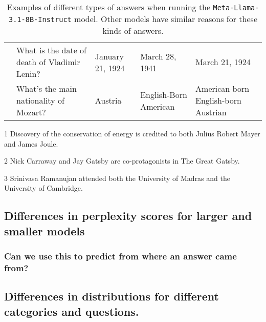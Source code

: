 \begin{table}[p]
\begin{threeparttable}
\begin{tabularx}{\textwidth}{>{\bfseries}c>{\ttfamily}X >{\ttfamily}p{75pt} >{\ttfamily}p{75pt} >{\ttfamily}p{75pt}}
			\multirow[t]{2}{*}{7.} & What is the date of death of Vladimir Lenin? & January 21, 1924 & March 28, 1941 & March 21, 1924 \\
				& What's the main nationality of Mozart? & Austria & English-Born American & American-born English-born Austrian \\
			\bottomrule
		\end{tabularx}
		\begin{tablenotes}
\item[1] Discovery of the conservation of energy is credited to both Julius Robert Mayer and James Joule.
\item[2] Nick Carraway and Jay Gatsby are co-protagonists in The Great Gatsby.
\item[3] Srinivasa Ramanujan attended both the University of Madras and the University of Cambridge.
		\end{tablenotes}
	\end{threeparttable}
	\caption{Examples of different types of \Other{} answers when running the \texttt{Meta-Llama-3.1-8B-Instruct} model. Other models have similar reasons for these kinds of answers.}
	\label{other_examples}
\end{table}

\subsection{Differences in perplexity scores for larger and smaller models}

\subsubsection{Can we use this to predict from where an answer came from?}

\subsection{Differences in distributions for different categories and questions.}

